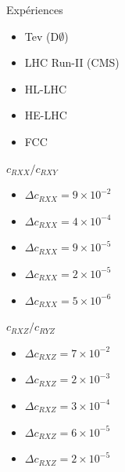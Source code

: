 \documentclass[a4paper,11pt,twoside,french]{article}
\begin{document}
                        \begin{multicols}{3}
                            Expériences
            				\begin{itemize}[label=$\triangleright$]
                				\item Tev (D$\emptyset$)
                				\item LHC Run-II (CMS)
                				\item HL-LHC 
                				\item HE-LHC 
                				\item FCC 
            				\end{itemize}
                            $c_{RXX} / c_{RXY}  $
                			\begin{itemize}[label=$\triangleright$]
                				\item $\Delta c_{RXX} =9\times 10^{-2}$		
                				\item $\Delta c_{RXX} =4\times 10^{-4}$		
                				\item $\Delta c_{RXX} =9\times 10^{-5}$		
                				\item $\Delta c_{RXX} =2\times 10^{-5}$		
                				\item $\Delta c_{RXX} =5\times 10^{-6}$		
                			\end{itemize}
                            $c_{RXZ}  / c_{RYZ} $
                			\begin{itemize}[label=$\triangleright$]
                				\item $\Delta c_{RXZ} =7\times 10^{-2}$		
                				\item $\Delta c_{RXZ} =2\times 10^{-3}$		
                				\item $\Delta c_{RXZ} =3\times 10^{-4}$		
                				\item $\Delta c_{RXZ} =6\times 10^{-5}$		
                				\item $\Delta c_{RXZ} =2\times 10^{-5}$		
                			\end{itemize}
                        \end{multicols}
\end{document}
